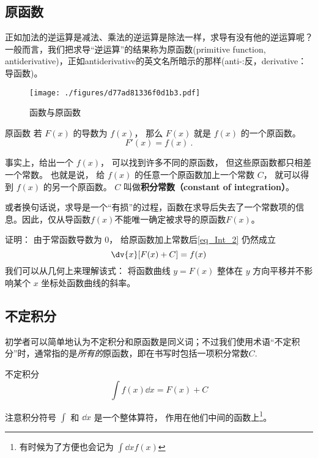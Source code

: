 
\subsection{原函数}
正如加法的逆运算是减法、乘法的逆运算是除法一样，求导有没有他的逆运算呢？一般而言，我们把求导“逆运算”的结果称为原函数(primitive function, antiderivative)，正如antiderivative的英文名所暗示的那样(anti-:反，derivative：导函数)。

\begin{figure}[ht]
\centering
\texttt{[image: ./figures/d77ad81336f0d1b3.pdf]}
\caption{函数与原函数} \label{fig_Int_1}
\end{figure}

\begin{definition}{原函数}
若 $F(x)$ 的导数为 $f(x)$， 那么 $F(x)$ 就是  $f(x)$ 的一个原函数。
\begin{equation}\label{eq_Int_2}
F'(x) = f(x)~.
\end{equation}
\end{definition}

\begin{theorem}{}
事实上，给出一个 $f(x)$， 可以找到许多不同的原函数， 但这些原函数都只相差一个常数。 也就是说， 给 $f(x)$ 的任意一个原函数加上一个常数 $C$， 就可以得到 $f(x)$ 的另一个原函数。 $C$ 叫做\textbf{积分常数（constant of integration）}。

或者换句话说，求导是一个“有损”的过程，函数在求导后失去了一个常数项的信息。因此，仅从导函数$f(x)$不能唯一确定被求导的原函数$F(x)$。
\end{theorem}

证明： 由于常函数导数为 $0$， 给原函数加上常数后\autoref{eq_Int_2} 仍然成立
\begin{equation}\label{eq_Int_3}
\dv{x} [F(x) + C] = f(x)
\end{equation}
我们可以从几何上来理解该式： 将函数曲线 $y = F(x)$ 整体在 $y$ 方向平移并不影响某个 $x$ 坐标处函数曲线的斜率。

\subsection{不定积分}
初学者可以简单地认为不定积分和原函数是同义词；不过我们使用术语“不定积分”时，通常指的是\textsl{所有的}原函数，即在书写时包括一项积分常数$C$.

\begin{definition}{不定积分}
\begin{equation}\label{eq_Int_1}
\int f(x) \dd{x} = F(x) + C
\end{equation}
\end{definition}
注意积分符号 $\int$ 和 $\dd{x}$ 是一个整体算符， 作用在他们中间的函数上\footnote{有时候为了方便也会记为 $\int\dd{x} f(x)$}。


